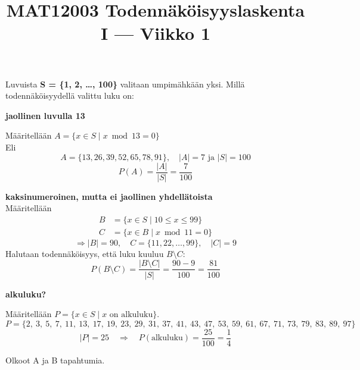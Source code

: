 \documentclass[12pt,a4paper]{article}
\title{MAT12003 Todennäköisyyslaskenta I — Viikko 1}
\date{}
\begin{document}
\maketitle

Luvuista \textbf{S = \{1, 2, \ldots, 100\}} valitaan umpimähkään yksi. Millä todennäköisyydellä valittu luku on:

\begin{kohta}
    \item \textbf{jaollinen luvulla 13}
    
    Määritellään $A = \{x \in S \mid x \bmod 13 = 0\}$\\
    Eli
    \[
    A = \{13, 26, 39, 52, 65, 78, 91\}, \quad |A| = 7 \text{ ja } |S| = 100
    \]
    \[
    P(A) = \frac{|A|}{|S|} = \frac{7}{100}
    \]

    \item \textbf{kaksinumeroinen, mutta ei jaollinen yhdellätoista} \\
    Määritellään
    \begin{align*}
        B &= \{x \in S \mid 10 \le x \le 99\} \\
        C &= \{x \in B \mid x \bmod 11 = 0\}
    \end{align*}
    \[
    \Rightarrow |B| = 90, \quad C = \{11, 22, \ldots, 99\},\quad |C| = 9
    \]
    Halutaan todennäköisyys, että luku kuuluu $B \setminus C$:
    \[
    P(B \setminus C) = \frac{|B \setminus C|}{|S|} = \frac{90 - 9}{100} = \frac{81}{100}
    \]

    \item \textbf{alkuluku?}

    Määritellään $P = \{x \in S \mid x \text{ on alkuluku}\}$.
    \[
    P = \{2,\ 3,\ 5,\ 7,\ 11,\ 13,\ 17,\ 19,\ 23,\ 29,\ 31,\ 37,\ 41,\ 43,\ 47,\ 53,\ 59,\ 61,\ 67,\ 71,\ 73,\ 79,\ 83,\ 89,\ 97\}
    \]
    \[
    |P| = 25 \quad \Rightarrow \quad P(\text{alkuluku}) = \frac{25}{100} = \frac{1}{4}
    \]
\end{kohta}









\newpage
{}

Olkoot A ja B tapahtumia.
\end{document}
